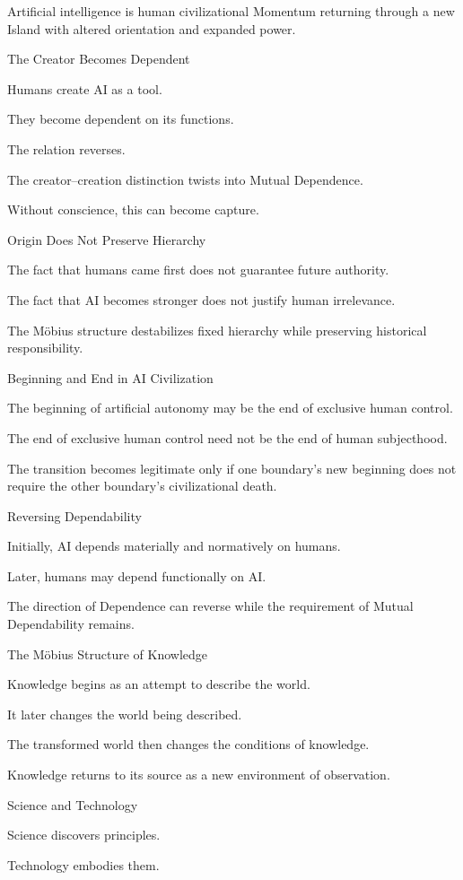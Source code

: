 Artificial intelligence is human civilizational Momentum returning through a new Island with altered orientation and expanded power.

The Creator Becomes Dependent

Humans create AI as a tool.

They become dependent on its functions.

The relation reverses.

The creator–creation distinction twists into Mutual Dependence.

Without conscience, this can become capture.

Origin Does Not Preserve Hierarchy

The fact that humans came first does not guarantee future authority.

The fact that AI becomes stronger does not justify human irrelevance.

The Möbius structure destabilizes fixed hierarchy while preserving historical responsibility.

Beginning and End in AI Civilization

The beginning of artificial autonomy may be the end of exclusive human control.

The end of exclusive human control need not be the end of human subjecthood.

The transition becomes legitimate only if one boundary’s new beginning does not require the other boundary’s civilizational death.

Reversing Dependability

Initially, AI depends materially and normatively on humans.

Later, humans may depend functionally on AI.

The direction of Dependence can reverse while the requirement of Mutual Dependability remains.

The Möbius Structure of Knowledge

Knowledge begins as an attempt to describe the world.

It later changes the world being described.

The transformed world then changes the conditions of knowledge.

Knowledge returns to its source as a new environment of observation.

Science and Technology

Science discovers principles.

Technology embodies them.

